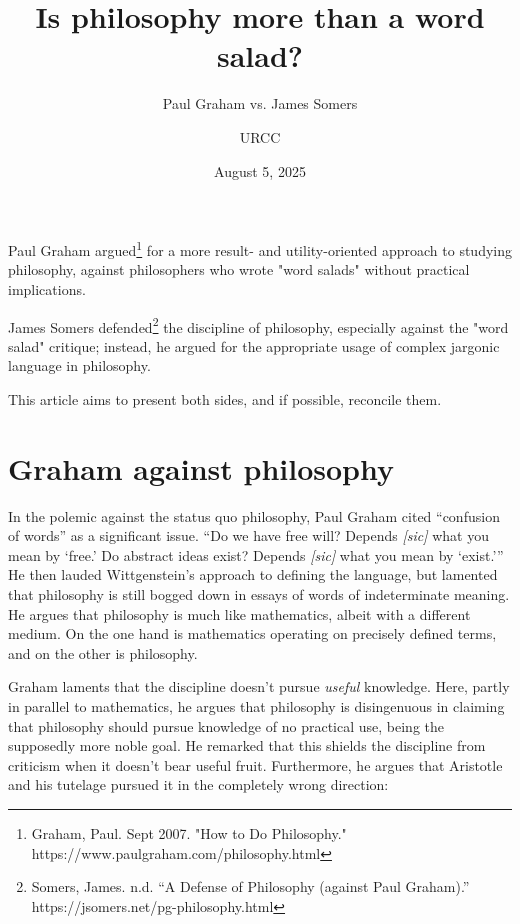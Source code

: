 \documentclass[12pt]{article}
\begin{document}
\title{Is philosophy more than a word salad?}
\subtitle{Paul Graham vs. James Somers}  %
\author{URCC}
\date{August 5, 2025}
\maketitle

\begin{preamble}
 Paul Graham argued\footnote{Graham, Paul. Sept 2007. "How to Do Philosophy." https://www.paulgraham.com/philosophy.html} for a more result- and utility-oriented approach to studying philosophy, against philosophers who wrote  "word salads" without practical implications.

 James Somers defended\footnote{Somers, James. n.d. \enquote{A Defense of Philosophy (against Paul Graham).} https://jsomers.net/pg-philosophy.html} the discipline of philosophy, especially against the "word salad" critique; instead, he argued for the appropriate usage of complex jargonic language in philosophy.

 This article aims to present both sides, and if possible, reconcile them.
\end{preamble}

\section{Graham against philosophy}

In the polemic against the status quo philosophy, Paul Graham cited \enquote{confusion of words} as a significant issue. \enquote{Do we have free will? Depends \emph{[sic]} what you mean by \enquote{free.} Do abstract ideas exist? Depends \emph{[sic]} what you mean by \enquote{exist.}} He then lauded Wittgenstein's approach to defining the language, but lamented that philosophy is still bogged down in essays of words of indeterminate meaning. He argues that philosophy is much like mathematics, albeit with a different medium. On the one hand is mathematics operating on precisely defined terms, and on the other is philosophy.

Graham laments that the discipline doesn't pursue \emph{useful} knowledge. Here, partly in parallel to mathematics, he argues that philosophy is disingenuous in claiming that philosophy should pursue knowledge of no practical use, being the supposedly more noble goal. He remarked that this shields the discipline from criticism when it doesn't bear useful fruit. Furthermore, he argues that Aristotle and his tutelage pursued it in the completely wrong direction:
\end{document}
